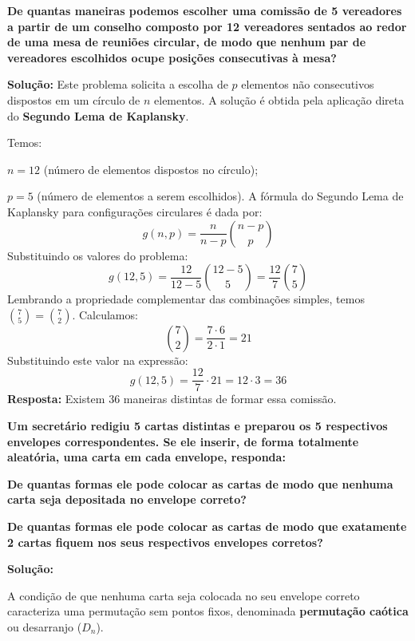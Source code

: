 \documentclass[a4paper,10pt,landscape,twocolumn]{article}  %
\let\oldenumerate\enumerate
\let\oldendenumerate\endenumerate
\renewenvironment{enumerate}{%
  \oldenumerate%
  \setlength{\itemsep}{1pt}%
  \setlength{\parskip}{0pt}%
  \setlength{\parsep}{0pt}%
  \setlength{\topsep}{2pt}%
  \setlength{\partopsep}{0pt}%
}{%
  \oldendenumerate%
}
\let\olditemize\itemize
\let\oldenditemize\enditemize
\renewenvironment{itemize}{%
  \olditemize%
  \setlength{\itemsep}{1pt}%
  \setlength{\parskip}{0pt}%
  \setlength{\parsep}{0pt}%
  \setlength{\topsep}{2pt}%
  \setlength{\partopsep}{0pt}%
}{%
  \oldenditemize%
}
\begin{document}
\begin{enumerate}
    \item \textbf{De quantas maneiras podemos escolher uma comissão de 5 vereadores a partir de um conselho composto por 12 vereadores sentados ao redor de uma mesa de reuniões circular, de modo que nenhum par de vereadores escolhidos ocupe posições consecutivas à mesa?}
    
    \textbf{Solução:}
    Este problema solicita a escolha de $p$ elementos não consecutivos dispostos em um círculo de $n$ elementos. A solução é obtida pela aplicação direta do \textbf{Segundo Lema de Kaplansky}.
    
    Temos:
    \begin{itemize}
        \item $n = 12$ (número de elementos dispostos no círculo);
        \item $p = 5$ (número de elementos a serem escolhidos).
    \end{itemize}
    A fórmula do Segundo Lema de Kaplansky para configurações circulares é dada por:
    \[ g(n, p) = \frac{n}{n-p} \binom{n-p}{p} \]
    Substituindo os valores do problema:
    \[ g(12, 5) = \frac{12}{12-5} \binom{12-5}{5} = \frac{12}{7} \binom{7}{5} \]
    Lembrando a propriedade complementar das combinações simples, temos $\binom{7}{5} = \binom{7}{2}$. Calculamos:
    \[ \binom{7}{2} = \frac{7 \cdot 6}{2 \cdot 1} = 21 \]
    Substituindo este valor na expressão:
    \[ g(12, 5) = \frac{12}{7} \cdot 21 = 12 \cdot 3 = 36 \]
    \textbf{Resposta:} Existem 36 maneiras distintas de formar essa comissão.

    \item \textbf{Um secretário redigiu 5 cartas distintas e preparou os 5 respectivos envelopes correspondentes. Se ele inserir, de forma totalmente aleatória, uma carta em cada envelope, responda:}
    \begin{enumerate}
        \item \textbf{De quantas formas ele pode colocar as cartas de modo que nenhuma carta seja depositada no envelope correto?}
        \item \textbf{De quantas formas ele pode colocar as cartas de modo que exatamente 2 cartas fiquem nos seus respectivos envelopes corretos?}
    \end{enumerate}
    
    \textbf{Solução:}
    \begin{enumerate}
        \item A condição de que nenhuma carta seja colocada no seu envelope correto caracteriza uma permutação sem pontos fixos, denominada \textbf{permutação caótica} ou desarranjo ($D_n$).
        

\end{enumerate}
\end{enumerate}
\end{document}
